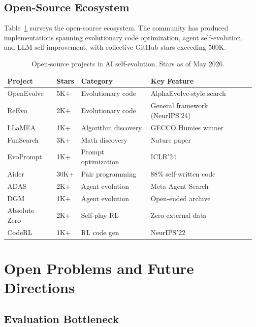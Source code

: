 \documentclass[11pt,a4paper]{article}
\begin{document}
\subsection{Open-Source Ecosystem}

Table~\ref{tab:opensource} surveys the open-source ecosystem. The community has produced implementations spanning evolutionary code optimization, agent self-evolution, and LLM self-improvement, with collective GitHub stars exceeding 500K.

\begin{table}[t]
\centering
\caption{Open-source projects in AI self-evolution. Stars as of May 2026.}
\label{tab:opensource}
\small
\begin{tabular}{@{}p{2.5cm}p{1.5cm}p{2.5cm}p{3cm}@{}}
\toprule
\textbf{Project} & \textbf{Stars} & \textbf{Category} & \textbf{Key Feature} \\
\midrule
OpenEvolve & 5K+ & Evolutionary code & AlphaEvolve-style search \\
ReEvo & 2K+ & Evolutionary code & General framework (NeurIPS'24) \\
LLaMEA & 1K+ & Algorithm discovery & GECCO Humies winner \\
FunSearch & 3K+ & Math discovery & Nature paper \\
EvoPrompt & 1K+ & Prompt optimization & ICLR'24 \\
Aider & 30K+ & Pair programming & 88\% self-written code \\
ADAS & 2K+ & Agent evolution & Meta Agent Search \\
DGM & 1K+ & Agent evolution & Open-ended archive \\
Absolute Zero & 2K+ & Self-play RL & Zero external data \\
CodeRL & 1K+ & RL code gen & NeurIPS'22 \\
\bottomrule
\end{tabular}
\end{table}

\section{Open Problems and Future Directions}
\label{sec:future}

\subsection{Evaluation Bottleneck}
\end{document}
